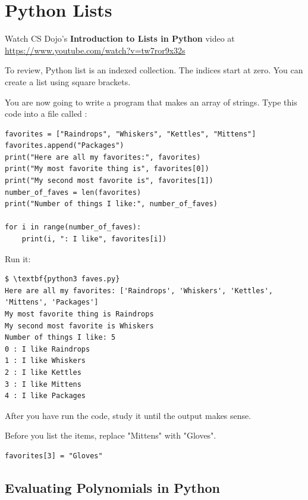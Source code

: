 \chapter{Python Lists}

Watch CS Dojo's \textbf{Introduction to Lists in Python} video at \url{https://www.youtube.com/watch?v=tw7ror9x32s}

To review, Python list is an indexed collection. The indices start at
zero. You can create a list using square brackets.

You are now going to write a program that makes an array of
strings. Type this code into a file called :

\begin{Verbatim}
favorites = ["Raindrops", "Whiskers", "Kettles", "Mittens"]
favorites.append("Packages")
print("Here are all my favorites:", favorites)
print("My most favorite thing is", favorites[0])
print("My second most favorite is", favorites[1])
number_of_faves = len(favorites)
print("Number of things I like:", number_of_faves)

for i in range(number_of_faves):
    print(i, ": I like", favorites[i])
\end{Verbatim}

Run it:
\begin{Verbatim}[commandchars=\\\{\}]
$ \textbf{python3 faves.py}
Here are all my favorites: ['Raindrops', 'Whiskers', 'Kettles', 'Mittens', 'Packages']
My most favorite thing is Raindrops
My second most favorite is Whiskers
Number of things I like: 5
0 : I like Raindrops
1 : I like Whiskers
2 : I like Kettles
3 : I like Mittens
4 : I like Packages
\end{Verbatim}
After you have run the code, study it until the output makes sense.

\begin{Exercise}[title={Assign into list}, label=assignintolist]
  Before you list the items, replace "Mittens" with "Gloves".
\end{Exercise}
\begin{Answer}[ref=assignintolist]
\begin{Verbatim}
favorites[3] = "Gloves"
\end{Verbatim}
\end{Answer}

\section{Evaluating Polynomials in Python}


